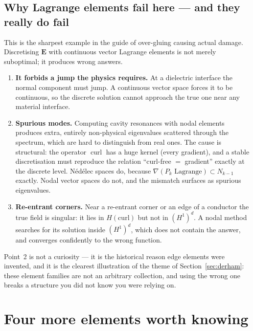 \documentclass[11pt,a4paper]{article}
\newcommand{\Hcurl}{H(\mathrm{curl})}
\newcommand{\curl}{\operatorname{curl}}
\newcommand{\bE}{\mathbf{E}}
\begin{document}
\subsection{Why Lagrange elements fail here --- and they really do fail}

This is the sharpest example in the guide of over-gluing causing actual damage.
Discretising $\bE$ with continuous vector Lagrange elements is not merely
suboptimal; it produces wrong answers.

\begin{enumerate}
\item \textbf{It forbids a jump the physics requires.} At a dielectric
  interface the normal component must jump. A continuous vector space forces it
  to be continuous, so the discrete solution cannot approach the true one near
  any material interface.
\item \textbf{Spurious modes.} Computing cavity resonances with nodal elements
  produces extra, entirely non-physical eigenvalues scattered through the
  spectrum, which are hard to distinguish from real ones. The cause is
  structural: the operator $\curl$ has a huge kernel (every gradient), and a
  stable discretisation must reproduce the relation ``curl-free $=$ gradient''
  exactly at the discrete level. Nédélec spaces do, because
  $\nabla(P_k\text{ Lagrange}) \subset N_{k-1}$ exactly. Nodal vector spaces do
  not, and the mismatch surfaces as spurious eigenvalues.
\item \textbf{Re-entrant corners.} Near a re-entrant corner or an edge of a
  conductor the true field is singular: it lies in $\Hcurl$ but not in
  $(H^1)^d$. A nodal method searches for its solution inside $(H^1)^d$, which
  does not contain the answer, and converges confidently to the wrong
  function.
\end{enumerate}

Point~2 is not a curiosity --- it is the historical reason edge elements were
invented, and it is the clearest illustration of the theme of
Section~\ref{sec:derham}: these element families are not an arbitrary
collection, and using the wrong one breaks a structure you did not know you
were relying on.

\FloatBarrier

\section{Four more elements worth knowing}
\end{document}
